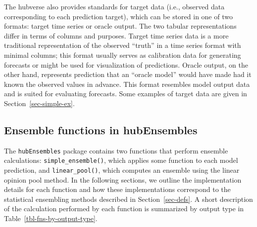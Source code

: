 \documentclass[
]{article}
\begin{document}
The hubverse also provides standards for target data (i.e., observed
data corresponding to each prediction target), which can be stored in
one of two formats: target time series or oracle output. The two tabular
representations differ in terms of columns and purposes. Target time
series data is a more traditional representation of the observed
``truth'' in a time series format with minimal columns; this format
usually serves as calibration data for generating forecasts or might be
used for visualization of predictions. Oracle output, on the other hand,
represents prediction that an ``oracle model'' would have made had it
known the observed values in advance. This format resembles model output
data and is suited for evaluating forecasts. Some examples of target
data are given in Section~\ref{sec-simple-ex}.

\subsection{Ensemble functions in hubEnsembles}\label{sec-ens-fns}

The \texttt{hubEnsembles} package contains two functions that perform
ensemble calculations: \texttt{simple\_ensemble()}, which applies some
function to each model prediction, and \texttt{linear\_pool()}, which
computes an ensemble using the linear opinion pool method. In the
following sections, we outline the implementation details for each
function and how these implementations correspond to the statistical
ensembling methods described in Section~\ref{sec-defs}. A short
description of the calculation performed by each function is summarized
by output type in Table~\ref{tbl-fns-by-output-type}.
\end{document}

